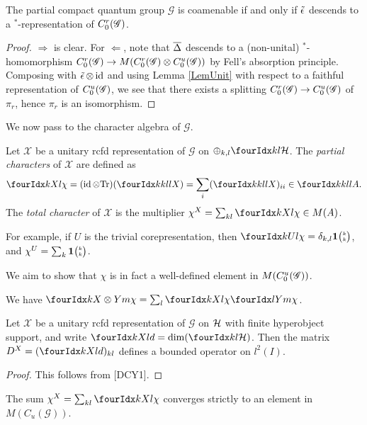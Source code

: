 \begin{Cor} The partial compact quantum group $\mathscr{G}$ is coamenable if and only if $\operatorname{\tilde{\epsilon}}$ descends to a $^*$-representation of $C^{r}_{0}(\mathscr{G})$.
\end{Cor} 
\begin{proof} $\Rightarrow$ is clear. For $\Leftarrow$, note that $\overline{\Delta}$ descends to a (non-unital) $^*$-homomorphism $C^{r}_{0}(\mathscr{G})\rightarrow M(C^{r}_{0}(\mathscr{G})\otimes C^{u}_{0}(\mathscr{G}))$ by Fell's absorption principle. Composing with $\operatorname{\tilde{\epsilon}}\otimes \operatorname{id}$ and using Lemma \ref{LemUnit} with respect to a faithful representation of $C^{u}_{0}(\mathscr{G})$, we see that there exists a splitting $C^{r}_{0}(\mathscr{G})\rightarrow C^{u}_{0}(\mathscr{G})$ of $\pi_r$, hence $\pi_r$ is an isomorphism.
\end{proof}
 
 We now pass to the character algebra of $\mathscr{G}$.
 
 \begin{Def} Let $\mathscr{X}$ be a unitary rcfd representation of $\mathscr{G}$ on $\oplus_{k,l} \Gru{\Hsp}{k}{l}$. The \emph{partial characters} of $\mathscr{X}$ are defined as \[\Gr{\chi}{}{X}{k}{l} = (\id\otimes \Tr)(\Gr{X}{k}{l}{k}{l}) = \sum_i(\Gr{X}{k}{l}{k}{l})_{ii} \in \Gr{A}{k}{l}{k}{l}.\]
 The \emph{total character} of $\mathscr{X}$ is the multiplier $\chi^X  =\sum_{kl} \Gr{\chi}{}{X}{k}{l}\in M(A)$.
 \end{Def}
 
 For example, if $U$ is the trivial corepresentation, then $\Gr{\chi}{}{U}{k}{l} = \delta_{k,l}\UnitC{k}{k}$, and $\chi^U = \sum_k \mathbf{1}{\tiny {\begin{pmatrix} k\\k\end{pmatrix}}}$.
 
 We aim to show that $\chi$ is in fact a well-defined element in $M(C^{u}_{0}(\mathscr{G}))$. 
 
 \begin{Lem}\label{LemBoundDim} We have $\Gr{\chi}{}{X\otimes Y}{k}{m}= \sum_l \Gr{\chi}{}{X}{k}{l}\Gr{\chi}{}{Y}{l}{m}$.
 \end{Lem}
 
 \begin{Lem} Let $\mathscr{X}$ be a unitary rcfd representation of $\mathscr{G}$ on $\mathcal{H}$ with finite hyperobject support, and write $\Gr{d}{}{X}{k}{l} = \dim(\Gru{\Hsp}{k}{l})$. Then the matrix $D^X = (\Gr{d}{}{X}{k}{l})_{kl}$ defines a bounded operator on $l^2(I)$. 
  \end{Lem}
  \begin{proof} This follows from [DCY1].
   \end{proof} 
   
\begin{Cor} The sum $\chi^X  =\sum_{kl} \Gr{\chi}{}{X}{k}{l}$ converges strictly to an element in $M(C_u(\mathscr{G}))$. 
\end{Cor} 
 

